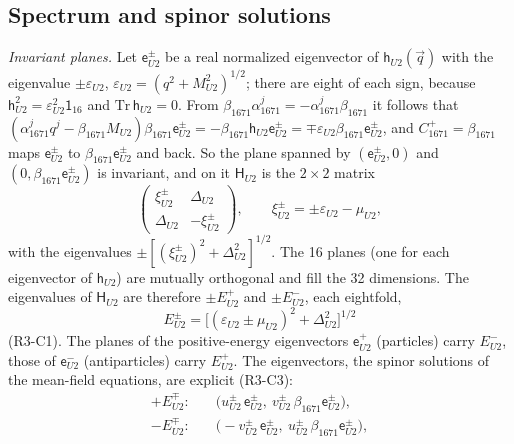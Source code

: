 \subsection{Spectrum and spinor solutions}
\label{sec:spectrum}

\emph{Invariant planes.} Let $\mathsf e^\pm_{U2}$ be a real normalized eigenvector of
$\mathsf h_{U2}(\vec q)$ with the eigenvalue $\pm\varepsilon_{U2}$,
$\varepsilon_{U2}=(q^2+M^2_{U2})^{1/2}$; there are eight of each sign, because
$\mathsf h_{U2}^2=\varepsilon_{U2}^2\mathsf 1_{16}$ and $\mathrm{Tr}\,\mathsf h_{U2}=0$. From
$\beta_{1671}\alpha^j_{1671}=-\alpha^j_{1671}\beta_{1671}$ it follows that
$(\alpha^j_{1671}q^j-\beta_{1671}M_{U2})\beta_{1671}\mathsf e^\pm_{U2}=
-\beta_{1671}\mathsf h_{U2}\mathsf e^\pm_{U2}=\mp\varepsilon_{U2}\beta_{1671}\mathsf e^\pm_{U2}$, and
$C^+_{1671}=\beta_{1671}$ maps $\mathsf e^\pm_{U2}$ to $\beta_{1671}\mathsf e^\pm_{U2}$ and back. So the
plane spanned by $(\mathsf e^\pm_{U2},0)$ and $(0,\beta_{1671}\mathsf e^\pm_{U2})$ is invariant, and
on it $\mathsf H_{U2}$ is the $2\times2$ matrix
\begin{equation}
\begin{pmatrix}\xi^\pm_{U2}&\Delta_{U2}\\ \Delta_{U2}&-\xi^\pm_{U2}\end{pmatrix},\qquad
\xi^\pm_{U2}=\pm\varepsilon_{U2}-\mu_{U2},
\label{eq:block}
\end{equation}
with the eigenvalues $\pm[(\xi^\pm_{U2})^2+\Delta_{U2}^2]^{1/2}$. The 16 planes (one for each
eigenvector of $\mathsf h_{U2}$) are mutually orthogonal and fill the 32 dimensions. The
eigenvalues of $\mathsf H_{U2}$ are therefore $\pm E^+_{U2}$ and $\pm E^-_{U2}$, each eightfold,
\begin{equation}
E^\pm_{U2}=\big[(\varepsilon_{U2}\pm\mu_{U2})^2+\Delta_{U2}^2\big]^{1/2}
\label{eq:Epm}
\end{equation}
(R3-C1). The planes of the positive-energy eigenvectors $\mathsf e^+_{U2}$ (particles) carry
$E^-_{U2}$, those of $\mathsf e^-_{U2}$ (antiparticles) carry $E^+_{U2}$. The eigenvectors, the
spinor solutions of the mean-field equations, are explicit (R3-C3):
\begin{equation}
\begin{aligned}
+E^\mp_{U2}:&\quad \big(u^\pm_{U2}\,\mathsf e^\pm_{U2},\ v^\pm_{U2}\,\beta_{1671}\mathsf e^\pm_{U2}\big),\\
-E^\mp_{U2}:&\quad \big(-v^\pm_{U2}\,\mathsf e^\pm_{U2},\ u^\pm_{U2}\,\beta_{1671}\mathsf e^\pm_{U2}\big),
\end{aligned}
\label{eq:spinors}
\end{equation}
